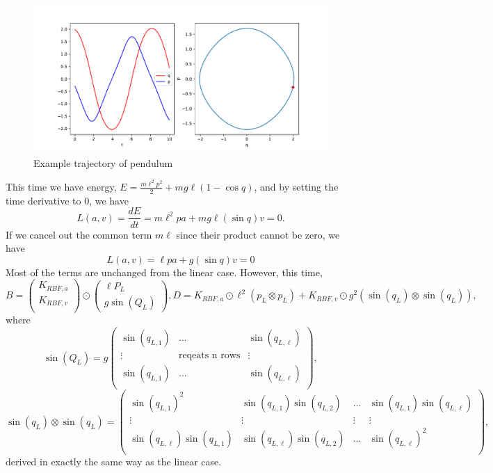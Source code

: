 \documentclass{statsmsc}
\begin{document}
\begin{figure}[H] 
  \includegraphics[width=0.6\linewidth]{../codes/figures/pendulum_trajectory_1D.pdf}
  \centering
  \caption{Example trajectory of pendulum}
  \label{fig:pendulum_trajectory}
\end{figure}

This time we have energy, $E=\frac{m\ell^2p^2}{2}+mg\ell(1-\cos q)$, and by setting the time derivative to 0, we have 
$$L(a, v)=\frac{dE}{dt}=m\ell^2pa+mg\ell(\sin q)v=0.$$
If we cancel out the common term $m\ell$ since their product cannot be zero, we have $$L(a,v)=\ell pa+g(\sin q)v=0$$
Most of the terms are unchanged from the linear case. 
However, this time, 
$$
B=\begin{pmatrix}
    K_{RBF,a} \\ K_{RBF,v} \\
\end{pmatrix}\odot \begin{pmatrix}
    \ell P_L \\ g\sin(Q_L)
\end{pmatrix}, D=K_{RBF,a}\odot \ell^2(p_L\otimes p_L) + K_{RBF,v}\odot g^2(\sin(q_L)\otimes \sin(q_L)),
$$
where 
$$
\sin(Q_L) = g\begin{pmatrix}
  \sin(q_{L,1})  & \dots & \sin(q_{L,\ell})  \\
  \vdots & \text{reqeats n rows} &  \vdots\\
  \sin(q_{L,1})  & \dots & \sin(q_{L,\ell})  \\
\end{pmatrix},
$$
$$
\sin(q_L)\otimes \sin(q_L)=\begin{pmatrix}
  \sin(q_{L,1})^2 & \sin(q_{L,1})\sin(q_{L,2}) & \dots & \sin(q_{L,1})\sin(q_{L,\ell}) \\
  \vdots & \vdots & \vdots & \vdots \\
  \sin(q_{L,\ell})\sin(q_{L,1}) & \sin(q_{L,\ell})\sin(q_{L,2}) & \dots & \sin(q_{L,\ell})^2 \\
\end{pmatrix},
$$
derived in exactly the same way as the linear case. 
\end{document}
